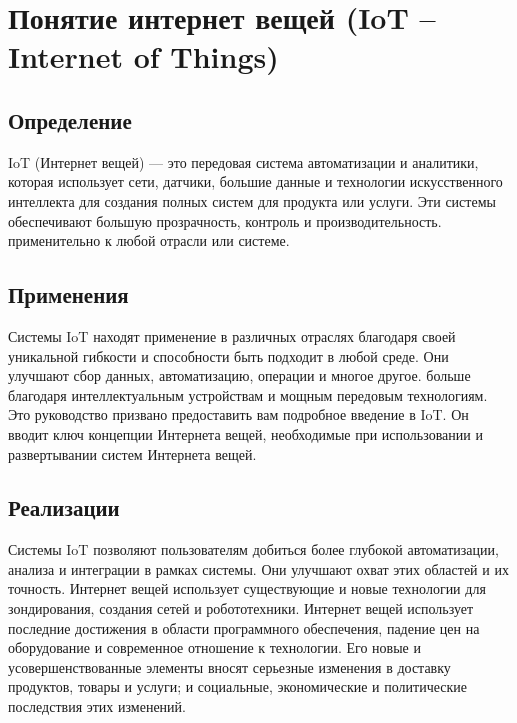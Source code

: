 \section{Понятие интернет вещей (IoT – Internet of Things)}

\subsection{Определение}
IoT (Интернет вещей) — это передовая система автоматизации и аналитики, которая использует
сети, датчики, большие данные и технологии искусственного интеллекта для создания полных систем
для продукта или услуги\cite{IoT}. Эти системы обеспечивают большую прозрачность, контроль и производительность.
применительно к любой отрасли или системе.

\subsection{Применения}
Системы IoT находят применение в различных отраслях благодаря своей уникальной гибкости и способности быть
подходит в любой среде. Они улучшают сбор данных, автоматизацию, операции и многое другое.
больше благодаря интеллектуальным устройствам и мощным передовым технологиям.
Это руководство призвано предоставить вам подробное введение в IoT. Он вводит ключ
концепции Интернета вещей, необходимые при использовании и развертывании систем Интернета вещей.

\subsection{Реализации}
Системы IoT позволяют пользователям добиться более глубокой автоматизации, анализа и интеграции в рамках системы.
Они улучшают охват этих областей и их точность. Интернет вещей использует существующие и новые
технологии для зондирования, создания сетей и робототехники.
Интернет вещей использует последние достижения в области программного обеспечения, падение цен на оборудование и современное отношение к
технологии. Его новые и усовершенствованные элементы вносят серьезные изменения в доставку продуктов,
товары и услуги; и социальные, экономические и политические последствия этих изменений.